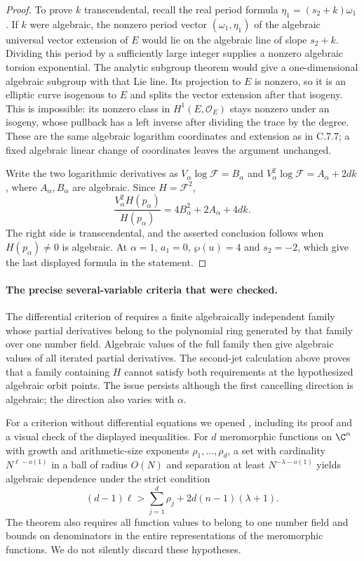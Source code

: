 \begin{proof}
To prove $k$ transcendental, recall the real period formula
$\eta_1=(s_2+k)\omega_1$. If $k$ were algebraic, the
nonzero period vector $(\omega_1,\eta_1)$ of the algebraic
universal vector extension of $E$ would lie on the algebraic
line of slope $s_2+k$. Dividing this period by a sufficiently
large integer supplies a nonzero algebraic torsion exponential.
The analytic subgroup theorem
\citep[Theorem 6.1]{huber2022} would give a one-dimensional
algebraic subgroup with that Lie line. Its projection to $E$
is nonzero, so it is an elliptic curve isogenous to $E$ and
splits the vector extension after that isogeny. This is
impossible: its nonzero class in $H^1(E,\mathcal O_E)$ stays
nonzero under an isogeny, whose pullback has a left inverse
after dividing the trace by the degree. These are the same
algebraic logarithm coordinates and extension as in C.7.7;
a fixed algebraic linear change of coordinates leaves the
argument unchanged.

Write the two logarithmic derivatives as
$V_\alpha\log\mathcal F=B_\alpha$ and
$V_\alpha^2\log\mathcal F=A_\alpha+2dk$, where
$A_\alpha,B_\alpha$ are algebraic. Since $H=\mathcal F^2$,
\[
 \frac{V_\alpha^2H(p_\alpha)}{H(p_\alpha)}
       =4B_\alpha^2+2A_\alpha+4dk.
\]
The right side is transcendental, and the asserted conclusion
follows when $H(p_\alpha)\ne0$ is algebraic.
At $\alpha=1$, $a_1=0$, $\wp(u)=4$ and $s_2=-2$,
which give the last displayed formula in the statement.
\end{proof}

\paragraph{The precise several-variable criteria that were checked.}
The differential criterion of
\citet[Theorems 3.6 and 3.7]{waldschmidt2009auxiliary}
requires a finite algebraically independent family whose
partial derivatives belong to the polynomial ring generated
by that family over one number field. Algebraic values of
the full family then give algebraic values of all iterated
partial derivatives. The second-jet calculation above proves
that a family containing $H$ cannot satisfy both requirements
at the hypothesized algebraic orbit points. The issue persists
although the first cancelling direction is algebraic; the
direction also varies with $\alpha$.

For a criterion without differential equations we opened
\citet[Theorem 1, p.~24]{waldschmidt1975dimension}, including
its proof and a visual check of the displayed inequalities.
For $d$ meromorphic functions on $\C^n$ with growth and
arithmetic-size exponents $\rho_1,\ldots,\rho_d$, a set with
cardinality $N^{\ell-o(1)}$ in a ball of radius $O(N)$ and
separation at least $N^{-\lambda-o(1)}$ yields algebraic
dependence under the strict condition
\begin{equation}\label{ari:eq:cc-rankcriterion}
 (d-1)\ell>\sum_{j=1}^d\rho_j
                     +2d(n-1)(\lambda+1).
\end{equation}
The theorem also requires all function values to belong to
one number field and bounds on denominators in the entire
representations of the meromorphic functions. We do not
silently discard these hypotheses.

